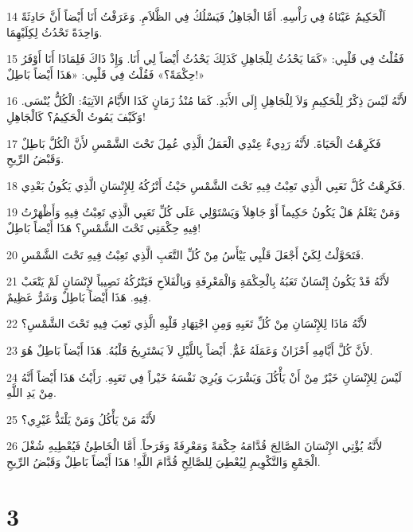 \par 14 اَلْحَكِيمُ عَيْنَاهُ فِي رَأْسِهِ. أَمَّا الْجَاهِلُ فَيَسْلُكُ فِي الظَّلاَمِ. وَعَرَفْتُ أَنَا أَيْضاً أَنَّ حَادِثَةً وَاحِدَةً تَحْدُثُ لِكِلَيْهِمَا.
\par 15 فَقُلْتُ فِي قَلْبِي: «كَمَا يَحْدُثُ لِلْجَاهِلِ كَذَلِكَ يَحْدُثُ أَيْضاً لِي أَنَا. وَإِذْ ذَاكَ فَلِمَاذَا أَنَا أَوْفَرُ حِكْمَةً؟» فَقُلْتُ فِي قَلْبِي: «هَذَا أَيْضاً بَاطِلٌ!»
\par 16 لأَنَّهُ لَيْسَ ذِكْرٌ لِلْحَكِيمِ وَلاَ لِلْجَاهِلِ إِلَى الأَبَدِ. كَمَا مُنْذُ زَمَانٍ كَذَا الأَيَّامُ الآتِيَةُ: الْكُلُّ يُنْسَى. وَكَيْفَ يَمُوتُ الْحَكِيمُ؟ كَالْجَاهِلِ!
\par 17 فَكَرِهْتُ الْحَيَاةَ. لأَنَّهُ رَدِيءٌ عِنْدِي الْعَمَلُ الَّذِي عُمِلَ تَحْتَ الشَّمْسِ لأَنَّ الْكُلَّ بَاطِلٌ وَقَبْضُ الرِّيحِ.
\par 18 فَكَرِهْتُ كُلَّ تَعَبِي الَّذِي تَعِبْتُ فِيهِ تَحْتَ الشَّمْسِ حَيْثُ أَتْرُكُهُ لِلإِنْسَانِ الَّذِي يَكُونُ بَعْدِي.
\par 19 وَمَنْ يَعْلَمُ هَلْ يَكُونُ حَكِيماً أَوْ جَاهِلاً وَيَسْتَوْلِي عَلَى كُلِّ تَعَبِي الَّذِي تَعِبْتُ فِيهِ وَأَظْهَرْتُ فِيهِ حِكْمَتِي تَحْتَ الشَّمْسِ؟ هَذَا أَيْضاً بَاطِلٌ!
\par 20 فَتَحَوَّلْتُ لِكَيْ أَجْعَلَ قَلْبِي يَيْأَسُ مِنْ كُلِّ التَّعَبِ الَّذِي تَعِبْتُ فِيهِ تَحْتَ الشَّمْسِ.
\par 21 لأَنَّهُ قَدْ يَكُونُ إِنْسَانٌ تَعَبُهُ بِالْحِكْمَةِ وَالْمَعْرِفَةِ وَبِالْفَلاَحِ فَيَتْرُكُهُ نَصِيباً لإِنْسَانٍ لَمْ يَتْعَبْ فِيهِ. هَذَا أَيْضاً بَاطِلٌ وَشَرٌّ عَظِيمٌ.
\par 22 لأَنَّهُ مَاذَا لِلإِنْسَانِ مِنْ كُلِّ تَعَبِهِ وَمِنِ اجْتِهَادِ قَلْبِهِ الَّذِي تَعِبَ فِيهِ تَحْتَ الشَّمْسِ؟
\par 23 لأَنَّ كُلَّ أَيَّامِهِ أَحْزَانٌ وَعَمَلَهُ غَمٌّ. أَيْضاً بِاللَّيْلِ لاَ يَسْتَرِيحُ قَلْبُهُ. هَذَا أَيْضاً بَاطِلٌ هُوَ.
\par 24 لَيْسَ لِلإِنْسَانِ خَيْرٌ مِنْ أَنْ يَأْكُلَ وَيَشْرَبَ وَيُرِيَ نَفْسَهُ خَيْراً فِي تَعَبِهِ. رَأَيْتُ هَذَا أَيْضاً أَنَّهُ مِنْ يَدِ اللَّهِ.
\par 25 لأَنَّهُ مَنْ يَأْكُلُ وَمَنْ يَلْتَذُّ غَيْرِي؟
\par 26 لأَنَّهُ يُؤْتِي الإِنْسَانَ الصَّالِحَ قُدَّامَهُ حِكْمَةً وَمَعْرِفَةً وَفَرَحاً. أَمَّا الْخَاطِئُ فَيُعْطِيهِ شُغْلَ الْجَمْعِ وَالتَّكْوِيمِ لِيُعْطِيَ لِلصَّالِحِ قُدَّامَ اللَّهِ! هَذَا أَيْضاً بَاطِلٌ وَقَبْضُ الرِّيحِ.

\chapter{3}

